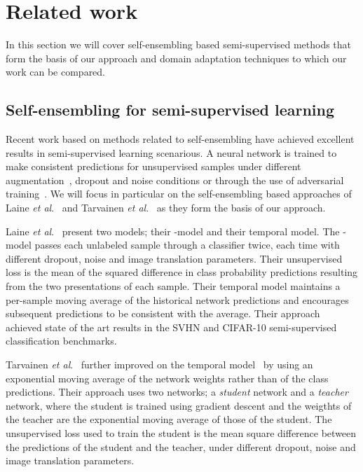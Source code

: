 \documentclass{article}
\newcommand{\etal}{\textit{et al}.}
\begin{document}
\section{Related work}
\label{sec:related}

In this section we will cover self-ensembling based semi-supervised methods that form the basis of our approach and domain adaptation techniques to which our work can be compared.

\subsection{Self-ensembling for semi-supervised learning}
\label{sec:related:semisup}

Recent work based on methods related to self-ensembling have achieved excellent results in semi-supervised learning scenarious. A neural network is trained to make consistent predictions for unsupervised samples under different augmentation~\cite{Sajjadi:RegPertSemiSup}, dropout and noise conditions or through the use of adversarial training~\cite{Miyato:VATSemiSup}. We will focus in particular on the self-ensembling based approaches of Laine \etal~\cite{Laine:Temporal} and Tarvainen \etal~\cite{Tarvainen:Mean} as they form the basis of our approach.

Laine \etal~\cite{Laine:Temporal} present two models; their -model and their temporal model. The -model passes each unlabeled sample through a classifier twice, each time with different dropout, noise and image translation parameters. Their unsupervised loss is the mean of the squared difference in class probability predictions resulting from the two presentations of each sample. Their temporal model maintains a per-sample moving average of the historical network predictions and encourages subsequent predictions to be consistent with the average. Their approach achieved state of the art results in the SVHN and CIFAR-10 semi-supervised classification benchmarks.

Tarvainen \etal~\cite{Tarvainen:Mean} further improved on the temporal model~\cite{Laine:Temporal} by using an exponential moving average of the network weights rather than of the class predictions. Their approach uses two networks; a \emph{student} network and a \emph{teacher} network, where the student is trained using gradient descent and the weigthts of the teacher are the exponential moving average of those of the student. The unsupervised loss used to train the student is the mean square difference between the predictions of the student and the teacher, under different dropout, noise and image translation parameters.
\end{document}
